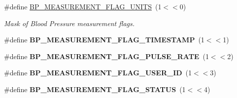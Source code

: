 \begin{DoxyCompactItemize}
\item 
\#define \hyperlink{group___b_l_e___b_p_s_gaae88c05e6fec892dca5a854f5485b623}{B\+P\+\_\+\+M\+E\+A\+S\+U\+R\+E\+M\+E\+N\+T\+\_\+\+F\+L\+A\+G\+\_\+\+U\+N\+I\+TS}~(1$<$$<$0)\hypertarget{group___b_l_e___b_p_s_gaae88c05e6fec892dca5a854f5485b623}{}\label{group___b_l_e___b_p_s_gaae88c05e6fec892dca5a854f5485b623}

\begin{DoxyCompactList}\small\item\em Mask of Blood Pressure measurement flags. \end{DoxyCompactList}\item 
\#define {\bfseries B\+P\+\_\+\+M\+E\+A\+S\+U\+R\+E\+M\+E\+N\+T\+\_\+\+F\+L\+A\+G\+\_\+\+T\+I\+M\+E\+S\+T\+A\+MP}~(1$<$$<$1)\hypertarget{group___b_l_e___b_p_s_ga31777d102b5eab7a831091b2f63cdbbb}{}\label{group___b_l_e___b_p_s_ga31777d102b5eab7a831091b2f63cdbbb}

\item 
\#define {\bfseries B\+P\+\_\+\+M\+E\+A\+S\+U\+R\+E\+M\+E\+N\+T\+\_\+\+F\+L\+A\+G\+\_\+\+P\+U\+L\+S\+E\+\_\+\+R\+A\+TE}~(1$<$$<$2)\hypertarget{group___b_l_e___b_p_s_ga23e662ee3844a98dd1819661beb322d1}{}\label{group___b_l_e___b_p_s_ga23e662ee3844a98dd1819661beb322d1}

\item 
\#define {\bfseries B\+P\+\_\+\+M\+E\+A\+S\+U\+R\+E\+M\+E\+N\+T\+\_\+\+F\+L\+A\+G\+\_\+\+U\+S\+E\+R\+\_\+\+ID}~(1$<$$<$3)\hypertarget{group___b_l_e___b_p_s_gaabfcd7036edeb64c7aa7e4fe23b8dbd9}{}\label{group___b_l_e___b_p_s_gaabfcd7036edeb64c7aa7e4fe23b8dbd9}

\item 
\#define {\bfseries B\+P\+\_\+\+M\+E\+A\+S\+U\+R\+E\+M\+E\+N\+T\+\_\+\+F\+L\+A\+G\+\_\+\+S\+T\+A\+T\+US}~(1$<$$<$4)\hypertarget{group___b_l_e___b_p_s_ga927e479b6a7384364d3b15a0b6cf26b4}{}\label{group___b_l_e___b_p_s_ga927e479b6a7384364d3b15a0b6cf26b4}

\end{DoxyCompactItemize}

